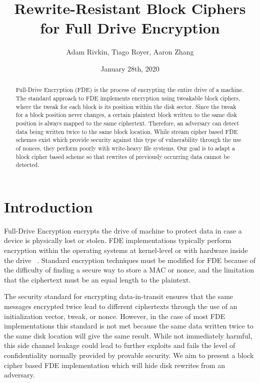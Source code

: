 \documentclass[11pt,twocolumn]{article}
\begin{document}
	
	\title{
		Rewrite-Resistant Block Ciphers for Full Drive Encryption
	}
	\date{January 28th, 2020}
	\author{Adam Rivkin, Tiago Royer, Aaron Zhang}
	\maketitle
	
	\begin{abstract}
		Full-Drive Encryption (FDE) is the process of encrypting the entire drive of a machine. The standard approach to FDE implements encryption using tweakable block ciphers, where the tweak for each block is its position within the disk sector. Since the tweak for a block position never changes, a certain plaintext block written to the same disk position is always mapped to the same ciphertext. Therefore, an adversary can detect data being written twice to the same block location. While stream cipher based FDE schemes exist which provide security against this type of vulnerability through the use of nonces, they perform poorly with write-heavy file systems. Our goal is to adapt a block cipher based scheme so that rewrites of previously occurring data cannot be detected.
	\end{abstract}
	
	\section*{Introduction}
	
	Full-Drive Encryption encrypts the drive of machine to protect data in case a device is physically lost or stolen. FDE implementations typically perform encryption within the operating systems at kernel-level or with hardware inside the drive ~\cite{muller2014systematic}. Standard encryption techniques must be modified for FDE because of the difficulty of finding a secure way to store a MAC or nonce, and the limitation that the ciphertext must be an equal length to the plaintext.
	
	The security standard for encrypting data-in-transit ensures that the same messages encrypted twice lead to different ciphertexts through the use of an initialization vector, tweak, or nonce. However, in the case of most FDE implementations this standard is not met because the same data written twice to the same disk location will give the same result. While not immediately harmful, this side channel leakage could lead to further exploits and fails the level of confidentiality normally provided by provable security. We aim to present a block cipher based FDE implementation which will hide disk rewrites from an adversary.
	
\end{document}
